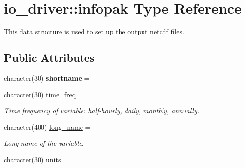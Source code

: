 \hypertarget{structio__driver_1_1infopak}{}\section{io\+\_\+driver\+:\+:infopak Type Reference}
\label{structio__driver_1_1infopak}


This data structure is used to set up the output netcdf files.  


\subsection*{Public Attributes}
\begin{DoxyCompactItemize}
\item 
\hypertarget{structio__driver_1_1infopak_af85ebf79810a2b1c018bb5f55242415f}{}character(30) {\bfseries shortname} = \textquotesingle{} \textquotesingle{}\label{structio__driver_1_1infopak_af85ebf79810a2b1c018bb5f55242415f}

\item 
\hypertarget{structio__driver_1_1infopak_a324552725ab98f552e2532c1da761c07}{}character(30) \hyperlink{structio__driver_1_1infopak_a324552725ab98f552e2532c1da761c07}{time\+\_\+freq} = \textquotesingle{}\textquotesingle{}\label{structio__driver_1_1infopak_a324552725ab98f552e2532c1da761c07}

\begin{DoxyCompactList}\small\item\em Time frequency of variable\+: half-\/hourly, daily, monthly, annually. \end{DoxyCompactList}\item 
\hypertarget{structio__driver_1_1infopak_a913b19d61355d59172842fba858ab65b}{}character(400) \hyperlink{structio__driver_1_1infopak_a913b19d61355d59172842fba858ab65b}{long\+\_\+name} = \textquotesingle{} \textquotesingle{}\label{structio__driver_1_1infopak_a913b19d61355d59172842fba858ab65b}

\begin{DoxyCompactList}\small\item\em Long name of the variable. \end{DoxyCompactList}\item 
\hypertarget{structio__driver_1_1infopak_a922a34bc21ab967231ef7703fe2c268d}{}character(30) \hyperlink{structio__driver_1_1infopak_a922a34bc21ab967231ef7703fe2c268d}{units} = \textquotesingle{} \textquotesingle{}\label{structio__driver_1_1infopak_a922a34bc21ab967231ef7703fe2c268d}


\end{DoxyCompactItemize}
